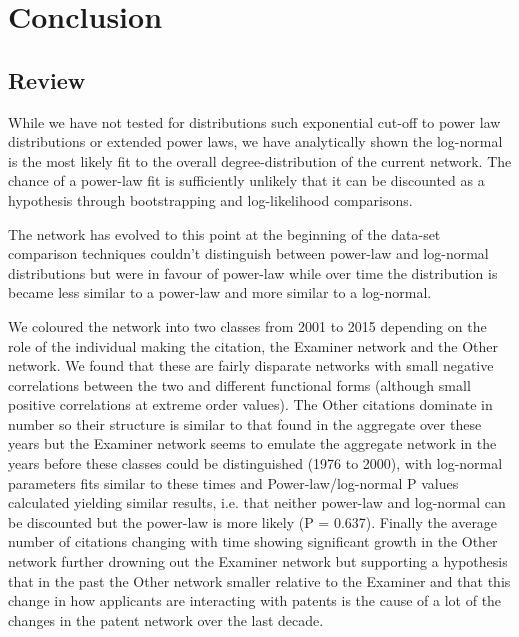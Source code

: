 
\chapter{Conclusion} %
	
\label{ChapterX} %


\section{Review}

While we have not tested for distributions such exponential cut-off to power law distributions or extended power laws, we have analytically shown the log-normal is the most likely fit to the overall degree-distribution of the current network. The chance of a power-law fit is sufficiently unlikely that it can be discounted as a hypothesis through bootstrapping and log-likelihood comparisons. 

The network has evolved to this point at the beginning of the data-set comparison techniques couldn't distinguish between power-law and log-normal distributions but were in favour of power-law while over time the distribution is became less similar to a power-law and more similar to a log-normal.

We coloured the network into two classes from 2001 to 2015 depending on the role of the individual making the citation, the Examiner network and the Other network. We found that these are fairly disparate networks with small negative correlations between the two and different functional forms (although small positive correlations at extreme order values). The Other citations dominate in number so their structure is similar to that found in the aggregate over these years but the Examiner network seems to emulate the aggregate network in the years before these classes could be distinguished (1976 to 2000), with log-normal parameters fits similar to these times and Power-law/log-normal P values calculated yielding similar results, i.e. that neither power-law and log-normal can be discounted but the power-law is more likely (P = 0.637). Finally the average number of citations changing with time showing significant growth in the Other network further drowning out the Examiner network but supporting a hypothesis that in the past the Other network smaller relative to the Examiner and that this change in how applicants are interacting with patents is the cause of a lot of the changes in the patent network over the last decade. 

